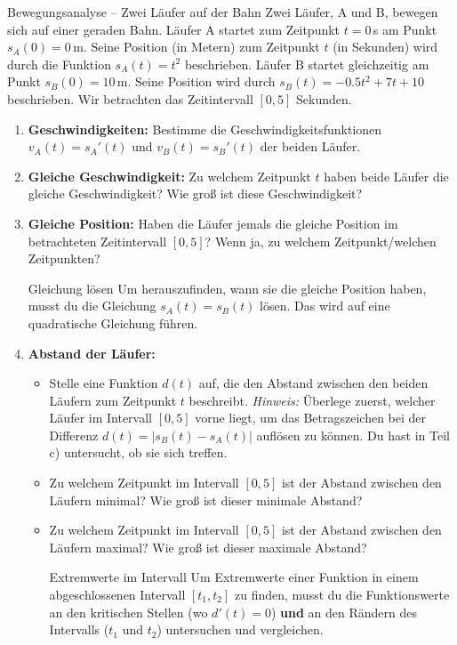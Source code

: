 \begin{aufgabenumgebung}{Bewegungsanalyse – Zwei Läufer auf der Bahn}
Zwei Läufer, A und B, bewegen sich auf einer geraden Bahn.
Läufer A startet zum Zeitpunkt $t=0\,$s am Punkt $s_A(0)=0\,$m. Seine Position (in Metern) zum Zeitpunkt $t$ (in Sekunden) wird durch die Funktion $s_A(t) = t^2$ beschrieben.
Läufer B startet gleichzeitig am Punkt $s_B(0)=10\,$m. Seine Position wird durch $s_B(t) = -0.5t^2 + 7t + 10$ beschrieben.
Wir betrachten das Zeitintervall $[0, 5]$ Sekunden.

\begin{enumerate}
    \item \textbf{Geschwindigkeiten:} Bestimme die Geschwindigkeitsfunktionen $v_A(t) = s_A'(t)$ und $v_B(t) = s_B'(t)$ der beiden Läufer.
    \item \textbf{Gleiche Geschwindigkeit:} Zu welchem Zeitpunkt $t$ haben beide Läufer die gleiche Geschwindigkeit? Wie groß ist diese Geschwindigkeit?
    \item \textbf{Gleiche Position:} Haben die Läufer jemals die gleiche Position im betrachteten Zeitintervall $[0,5]$? Wenn ja, zu welchem Zeitpunkt/welchen Zeitpunkten?
        \begin{tippumgebung}{Gleichung lösen}
        Um herauszufinden, wann sie die gleiche Position haben, musst du die Gleichung $s_A(t) = s_B(t)$ lösen. Das wird auf eine quadratische Gleichung führen.
        \end{tippumgebung}
    \item \textbf{Abstand der Läufer:}
        \begin{itemize}
            \item Stelle eine Funktion $d(t)$ auf, die den Abstand zwischen den beiden Läufern zum Zeitpunkt $t$ beschreibt. 
            \textit{Hinweis:} Überlege zuerst, welcher Läufer im Intervall $[0,5]$ vorne liegt, um das Betragszeichen bei der Differenz $d(t) = |s_B(t) - s_A(t)|$ auflösen zu können. Du hast in Teil c) untersucht, ob sie sich treffen.
            \item Zu welchem Zeitpunkt im Intervall $[0,5]$ ist der Abstand zwischen den Läufern minimal? Wie groß ist dieser minimale Abstand?
            \item Zu welchem Zeitpunkt im Intervall $[0,5]$ ist der Abstand zwischen den Läufern maximal? Wie groß ist dieser maximale Abstand?
            \begin{tippumgebung}{Extremwerte im Intervall}
            Um Extremwerte einer Funktion in einem abgeschlossenen Intervall $[t_1, t_2]$ zu finden, musst du die Funktionswerte an den kritischen Stellen (wo $d'(t)=0$) \textbf{und} an den Rändern des Intervalls ($t_1$ und $t_2$) untersuchen und vergleichen.
            \end{tippumgebung}
        \end{itemize}
\end{enumerate}
\end{aufgabenumgebung}

